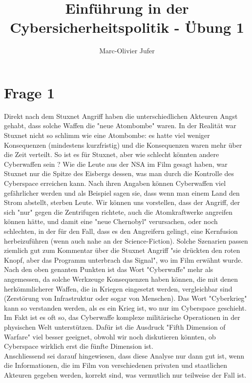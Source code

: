 \documentclass[10pt,a4paper]{article}
\author{Marc-Olivier Jufer}
\title{Einführung in der Cybersicherheitspolitik - Übung 1}
\begin{document}
	\maketitle

	\section*{Frage 1}
		Direkt nach dem Stuxnet Angriff haben die unterschiedlichen Akteuren Angst gehabt, dass solche Waffen die "neue Atombombe" waren. In der Realität war Stuxnet nicht so schlimm wie eine Atombombe: es hatte viel weniger Konsequenzen (mindestens kurzfristig) und die Konsequenzen waren mehr über die Zeit verteilt. So ist es für Stuxnet, aber wie schlecht könnten andere Cyberwaffen sein ? Wie die Leute aus der NSA im Film gesagt haben, war Stuxnet nur die Spitze des Eisbergs dessen, was man durch die Kontrolle des Cyberspace erreichen kann. Nach ihren Angaben können Cyberwaffen viel gefährlicher werden und als Beispiel sagen sie, dass wenn man einem Land den Strom abstellt, sterben Leute. Wir können uns vorstellen, dass der Angriff, der sich "nur" gegen die Zentrifugen richtete, auch die Atomkraftwerke angreifen können hätte, und damit eine "neue Chernobyl" verursachen, oder noch schlechten, in der für den Fall, dass es den Angreifern gelingt, eine Kernfusion herbeizuführen (wenn auch nahe an der Science-Fiction). Solche Szenarien passen ziemlich gut zum Kommentar über die Stuxnet Angriff "sie drückten den roten Knopf, aber das Programm unterbrach das Signal", wo im Film erwähnt wurde. \\
		
		Nach den oben genanten Punkten ist das Wort "Cyberwaffe" mehr als angemessen, da solche Werkzeuge Konsequenzen haben können, die mit denen herkömmlicherer Waffen, die in Kriegen eingesetzt werden, vergleichbar sind (Zerstörung von Infrastruktur oder sogar von Menschen). Das Wort "Cyberkrieg" kann so verstanden werden, als es ein Krieg ist, wo nur im Cyberspace geschieht. Im Fakt ist es oft so, das Cyberwaffe komplexe militärische Operationen in der physischen Welt unterstützen. Dafür ist die Ausdruck "Fifth Dimension of Warfare" viel besser geeignet, obwohl wir noch diskutieren könnten, ob Cyberspace wirklich erst die fünfte Dimension ist.\\
		
		
		
		Anschliessend sei darauf hingewiesen, dass diese Analyse nur dann gut ist, wenn die Informationen, die im Film von verschiedenen privaten und staatlichen Akteuren gegeben werden, korrekt sind, was vermutlich nur teilweise der Fall ist.\\


	
\end{document}
